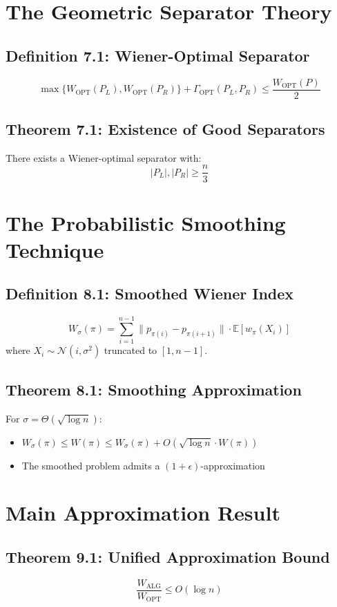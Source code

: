\documentclass{article}
\begin{document}
\section{The Geometric Separator Theory}

\subsection*{Definition 7.1: Wiener-Optimal Separator}
\[
	\max\{W_{\text{OPT}}(P_L), W_{\text{OPT}}(P_R)\} + \Gamma_{\text{OPT}}(P_L, P_R) \leq \frac{W_{\text{OPT}}(P)}{2}
\]

\subsection*{Theorem 7.1: Existence of Good Separators}
There exists a Wiener-optimal separator with:
\[
	|P_L|, |P_R| \geq \frac{n}{3}
\]

\section{The Probabilistic Smoothing Technique}

\subsection*{Definition 8.1: Smoothed Wiener Index}
\[
	W_\sigma(\pi) = \sum_{i=1}^{n-1} \|p_{\pi(i)} - p_{\pi(i+1)}\| \cdot \mathbb{E}[w_\pi(X_i)]
\]
where $X_i \sim \mathcal{N}(i, \sigma^2)$ truncated to $[1, n-1]$.

\subsection*{Theorem 8.1: Smoothing Approximation}
For $\sigma = \Theta(\sqrt{\log n})$:
\begin{itemize}
	\item $W_\sigma(\pi) \leq W(\pi) \leq W_\sigma(\pi) + O(\sqrt{\log n} \cdot W(\pi))$
	\item The smoothed problem admits a $(1 + \epsilon)$-approximation
\end{itemize}

\section{Main Approximation Result}

\subsection*{Theorem 9.1: Unified Approximation Bound}
\[
	\frac{W_{\text{ALG}}}{W_{\text{OPT}}} \leq O(\log n)
\]
\end{document}
